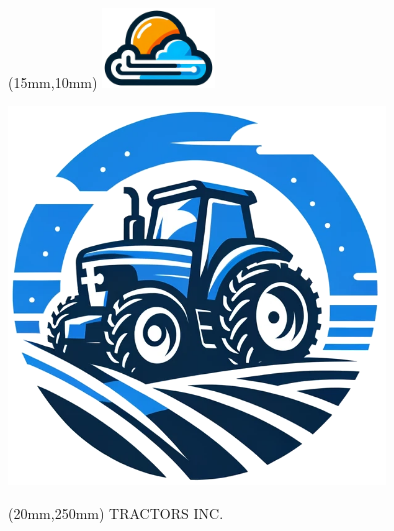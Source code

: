 \documentclass[a4paper,12pt,svgnames]{article}
\begin{document}
	\thispagestyle{empty}
	
	\begin{textblock*}{\paperwidth}(15mm,10mm)
		\includegraphics[width=30mm]{../img/CloudIcon}%
	\end{textblock*}%
	

		\null\vfill
		\begin{center}
			\includegraphics[width=100mm]{../img/tractor}%
		\end{center}
		\vfill\null


	\begin{textblock*}{\textwidth}(20mm,250mm)
		\Huge
		\raggedleft
		TRACTORS INC.
		\normalsize
	\end{textblock*}%
	
\end{document}
